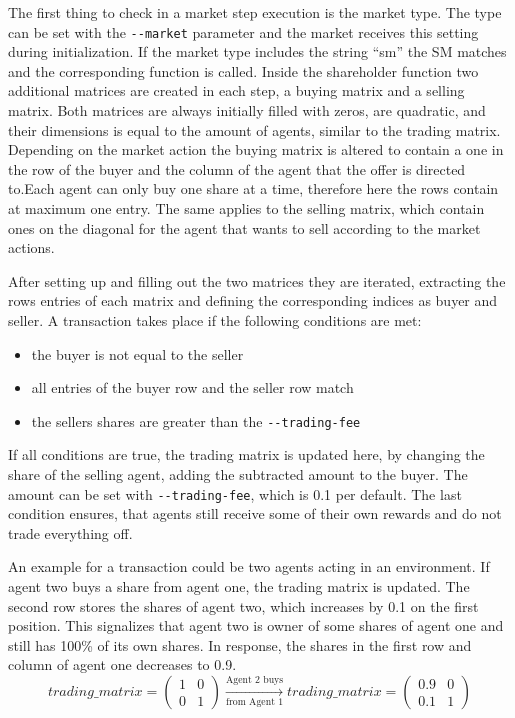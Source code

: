 The first thing to check in a market step execution is the market type. The type can be set with the \verb|--market| parameter and the market receives this setting during initialization. If the market type includes the string ``sm'' the SM matches and the corresponding function is called. Inside the shareholder function two additional matrices are created in each step, a buying matrix and a selling matrix. Both matrices are always initially filled with zeros, are quadratic, and their dimensions is equal to the amount of agents, similar to the trading matrix. Depending on the market action the buying matrix is altered to contain a one in the row of the buyer and the column of the agent that the offer is directed to.Each agent can only buy one share at a time, therefore here the rows contain at maximum one entry. The same applies to the selling matrix, which contain ones on the diagonal for the agent that wants to sell according to the market actions.

After setting up and filling out the two matrices they are iterated, extracting the rows entries of each matrix and defining the corresponding indices as buyer and seller. A transaction takes place if the following conditions are met:
\begin{itemize}
    \item the buyer is not equal to the seller
    \item all entries of the buyer row and the seller row match
    \item the sellers shares are greater than the \verb|--trading-fee|
\end{itemize}

If all conditions are true, the trading matrix is updated here, by changing the share of the selling agent, adding the subtracted amount to the buyer. The amount can be set with \verb|--trading-fee|, which is 0.1 per default. The last condition ensures, that agents still receive some of their own rewards and do not trade everything off. 

An example for a transaction could be two agents acting in an environment. If agent two buys a share from agent one, the trading matrix is updated. The second row stores the shares of agent two, which increases by 0.1 on the first position. This signalizes that agent two is owner of some shares of agent one and still has 100\% of its own shares. In response, the shares in the first row and column of agent one decreases to 0.9.
\begin{equation*}
trading\_matrix = 
\begin{pmatrix}
1 & 0 \\
0 & 1
\end{pmatrix} \xrightarrow[\text{from Agent 1}]{\text{Agent 2 buys}} 
trading\_matrix = 
\begin{pmatrix}
0.9 & 0 \\
0.1 & 1
\end{pmatrix} 
\end{equation*}

